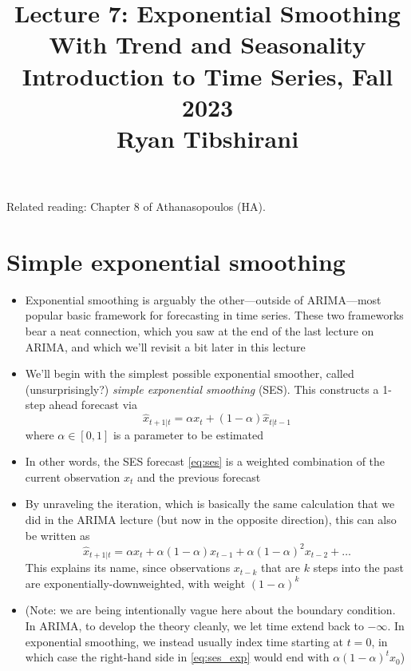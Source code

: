 \documentclass{article}
\title{Lecture 7: Exponential Smoothing With Trend and Seasonality \\ \smallskip
\large Introduction to Time Series, Fall 2023 \\ \smallskip
Ryan Tibshirani}
\date{}
\begin{document}
\maketitle
\RaggedRight
\vspace{-50pt}

Related reading: Chapter 8 of Athanasopoulos (HA).

\section{Simple exponential smoothing}

\begin{itemize}
\item Exponential smoothing is arguably the other---outside of ARIMA---most 
  popular basic framework for forecasting in time series. These two frameworks
  bear a neat connection, which you saw at the end of the last lecture on ARIMA,
  and which we'll revisit a bit later in this lecture

\item We'll begin with the simplest possible exponential smoother, called
  (unsurprisingly?) \emph{simple exponential smoothing} (SES). This constructs 
  a 1-step ahead forecast via
  \begin{equation}
  \label{eq:ses}
  \hat{x}_{t+1 | t }= \alpha x_t + (1-\alpha) \hat{x}_{t | t-1}
  \end{equation}
  where $\alpha \in [0,1]$ is a parameter to be estimated

\item In other words, the SES forecast \eqref{eq:ses} is a weighted combination 
  of the current observation $x_t$ and the previous forecast  

\item By unraveling the iteration, which is basically the same calculation that
  we did in the ARIMA lecture (but now in the opposite direction), this can also
  be written as    
  \begin{equation}
  \label{eq:ses_exp}
  \hat{x}_{t+1 | t} = \alpha x_t + \alpha (1-\alpha) x_{t-1} + \alpha
  (1-\alpha)^2 x_{t-2} + \dots
  \end{equation}
  This explains its name, since observations $x_{t-k}$ that are $k$ steps into 
  the past are exponentially-downweighted, with weight $(1-\alpha)^k$  

\item  (Note: we are being intentionally vague here about the boundary 
  condition. In ARIMA, to develop the theory cleanly, we let time extend back to
  $-\infty$. In  exponential smoothing, we instead usually index time starting
  at $t = 0$, in which case the right-hand side in \eqref{eq:ses_exp} would end
  with $\alpha (1-\alpha)^t x_0$)


\end{itemize}
\end{document}
